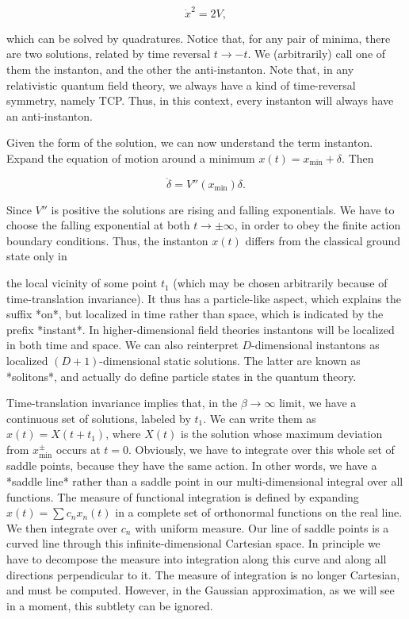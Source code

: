 \[
  \dot x^2=2V,
\]

which can be solved by quadratures. Notice that, for any pair of minima, there
are two solutions, related by time reversal $t\to-t$. We (arbitrarily) call one
of them the instanton, and the other the anti-instanton. Note that, in any
relativistic quantum field theory, we always have a kind of time-reversal
symmetry, namely TCP. Thus, in this context, every instanton will always have an
anti-instanton.

Given the form of the solution, we can now understand the term instanton.
Expand the equation of motion around a minimum $x(t)=x_{\min}+\delta$. Then

\[
  \ddot\delta=V''(x_{\min})\delta.
\]

Since $V''$ is positive the solutions are rising and falling exponentials. We
have to choose the falling exponential at both $t\to\pm\infty$, in order to
obey the finite action boundary conditions. Thus, the instanton $x(t)$ differs
from the classical ground state only in

the local vicinity of some point $t_1$ (which may be chosen arbitrarily because
of time-translation invariance). It thus has a particle-like aspect, which
explains the suffix *on*, but localized in time rather than space, which is
indicated by the prefix *instant*. In higher-dimensional field theories
instantons will be localized in both time and space. We can also reinterpret
$D$-dimensional instantons as localized $(D+1)$-dimensional static solutions.
The latter are known as *solitons*, and actually do define particle states in the
quantum theory.

Time-translation invariance implies that, in the $\beta\to\infty$ limit, we have
a continuous set of solutions, labeled by $t_1$. We can write them as
$x(t)=X(t+t_1)$, where $X(t)$ is the solution whose maximum deviation from
$x_{\min}^{\pm}$ occurs at $t=0$. Obviously, we have to integrate over this
whole set of saddle points, because they have the same action. In other words,
we have a *saddle line* rather than a saddle point in our multi-dimensional
integral over all functions. The measure of functional integration is defined by
expanding $x(t)=\sum c_nx_n(t)$ in a complete set of orthonormal functions on
the real line. We then integrate over $c_n$ with uniform measure. Our line of
saddle points is a curved line through this infinite-dimensional Cartesian space.
In principle we have to decompose the measure into integration along this curve
and along all directions perpendicular to it. The measure of integration is no
longer Cartesian, and must be computed. However, in the Gaussian approximation,
as we will see in a moment, this subtlety can be ignored.

